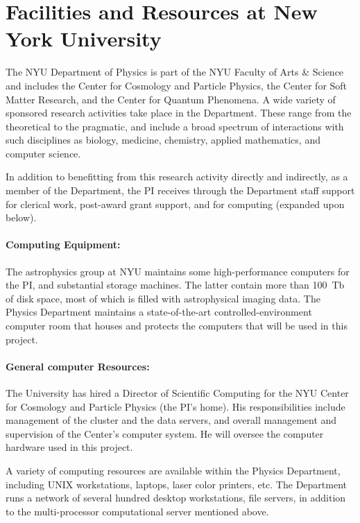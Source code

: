 \documentclass[12pt]{article}
\begin{document}
\sloppy\sloppypar\thispagestyle{empty}

\section{Facilities and Resources at New York University}

The NYU Department of Physics is part of the NYU Faculty of Arts \&
Science and includes the Center for Cosmology and Particle Physics,
the Center for Soft Matter Research, and the Center for Quantum Phenomena.
A wide variety of sponsored
research activities take place in the Department.  These range from
the theoretical to the pragmatic, and include a broad spectrum of
interactions with such disciplines as biology, medicine, chemistry,
applied mathematics, and computer science.

In addition to benefitting from this research activity directly and
indirectly, as a member of the Department, the PI receives through the
Department staff support for clerical work, post-award grant support,
and for computing (expanded upon below).

\paragraph{Computing Equipment:}

The astrophysics group at NYU maintains some high-performance computers
for the PI, and substantial storage machines.
The latter contain more than 100~Tb of disk space, most of which is filled
with astrophysical imaging data.  The Physics Department maintains a
state-of-the-art controlled-environment computer room that houses and
protects the computers that will be used in this project.

\paragraph{General computer Resources:}

The University has hired a Director of Scientific Computing for the
NYU Center for Cosmology and Particle Physics (the PI's home).  His
responsibilities include management of the cluster and the data
servers, and overall management and supervision of the Center's
computer system.  He will oversee the computer hardware used in this
project.

A variety of computing resources are available within the Physics
Department, including UNIX workstations, laptops, laser color
printers, etc.  The Department runs a network of several hundred
desktop workstations, file servers, in addition to the multi-processor
computational server mentioned above.
\end{document}
